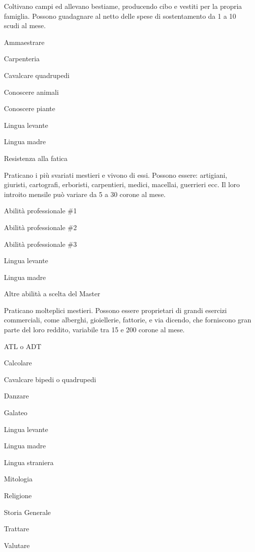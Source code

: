 Coltivano campi ed allevano bestiame, producendo cibo e vestiti
per la propria famiglia. Possono guadagnare al netto delle spese di
sostentamento da 1 a 10 scudi al mese.

\begin{abilist}
\item Ammaestrare 
\item Carpenteria
\item Cavalcare quadrupedi
\item Conoscere animali
\item Conoscere piante
\item Lingua levante
\item Lingua madre
\item Resistenza alla fatica
\end{abilist}


Praticano i pi\`u svariati mestieri e vivono di essi. Possono essere:
artigiani, giuristi, cartografi, erboristi, carpentieri, medici,
macellai, guerrieri ecc. Il loro introito mensile pu\`o variare da 5 a
30 corone al mese.

\begin{abilist}
\item Abilit\`a professionale \#1 
\item Abilit\`a professionale \#2
\item Abilit\`a professionale \#3
\item Lingua levante
\item Lingua madre 
\item Altre abilit\`a a scelta del Master
\end{abilist}


Praticano molteplici mestieri. Possono essere proprietari di grandi
esercizi commerciali, come alberghi, gioiellerie, fattorie, e via
dicendo, che forniscono gran parte del loro reddito, variabile tra 15 e
200 corone al mese.

\begin{abilist}
\item ATL o ADT
\item Calcolare
\item Cavalcare bipedi o quadrupedi
\item Danzare
\item Galateo
\item Lingua levante
\item Lingua madre
\item Lingua straniera
\item Mitologia
\item Religione
\item Storia Generale
\item Trattare
\item Valutare
\end{abilist}

